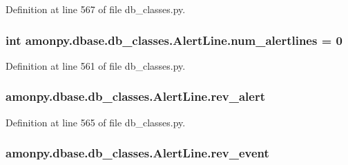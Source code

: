 Definition at line 567 of file db\-\_\-classes.\-py.

\hypertarget{classamonpy_1_1dbase_1_1db__classes_1_1_alert_line_a8450803058ff3da20dc1a9001b77082f}{
\subsubsection[{num\-\_\-alertlines}]{\setlength{\rightskip}{0pt plus 5cm}int amonpy.\-dbase.\-db\-\_\-classes.\-Alert\-Line.\-num\-\_\-alertlines = 0\hspace{0.3cm}{\ttfamily [static]}}}\label{classamonpy_1_1dbase_1_1db__classes_1_1_alert_line_a8450803058ff3da20dc1a9001b77082f}


Definition at line 561 of file db\-\_\-classes.\-py.

\hypertarget{classamonpy_1_1dbase_1_1db__classes_1_1_alert_line_acb48088679522c813ac7ad21924f98a1}{
\subsubsection[{rev\-\_\-alert}]{\setlength{\rightskip}{0pt plus 5cm}amonpy.\-dbase.\-db\-\_\-classes.\-Alert\-Line.\-rev\-\_\-alert}}\label{classamonpy_1_1dbase_1_1db__classes_1_1_alert_line_acb48088679522c813ac7ad21924f98a1}


Definition at line 565 of file db\-\_\-classes.\-py.

\hypertarget{classamonpy_1_1dbase_1_1db__classes_1_1_alert_line_a5180b21c821a1eb9540d88623e11378f}{
\subsubsection[{rev\-\_\-event}]{\setlength{\rightskip}{0pt plus 5cm}amonpy.\-dbase.\-db\-\_\-classes.\-Alert\-Line.\-rev\-\_\-event}}\label{classamonpy_1_1dbase_1_1db__classes_1_1_alert_line_a5180b21c821a1eb9540d88623e11378f}


